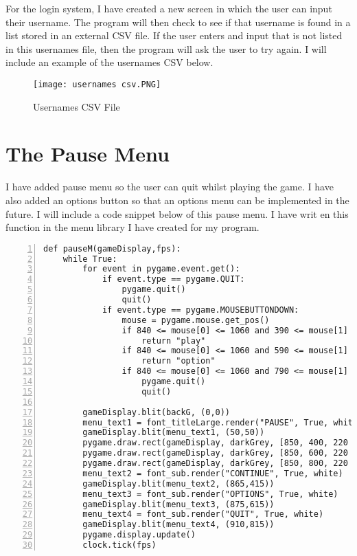 \documentclass[12pt]{report}
\begin{document}
\normalsize

For the login system, I have created a new screen in which the user can input their username. The program will then check to see if that username is found in a list stored in an external CSV file. If the user enters and input that is not listed in this usernames file, then the program will ask the user to try again. I will include an example of the usernames CSV below.

\begin{figure}[H]
    \centering
    \texttt{[image: usernames csv.PNG]}
    \caption{Usernames CSV File}
\end{figure}

\pagebreak

\section{The Pause Menu}
I have added pause menu so the user can quit whilst playing the game. I have also added an options button so that an options menu can be implemented in the future. I will include a code snippet below of this pause menu. I have writ en this function in the menu library I have created for my program.

\small

\begin{Verbatim}[numbers=left, frame=single]
def pauseM(gameDisplay,fps):
    while True:
        for event in pygame.event.get():
            if event.type == pygame.QUIT:
                pygame.quit()
                quit()
            if event.type == pygame.MOUSEBUTTONDOWN:
                mouse = pygame.mouse.get_pos()
                if 840 <= mouse[0] <= 1060 and 390 <= mouse[1] <= 470:
                    return "play"
                if 840 <= mouse[0] <= 1060 and 590 <= mouse[1] <= 670:
                    return "option"
                if 840 <= mouse[0] <= 1060 and 790 <= mouse[1] <= 870:
                    pygame.quit()
                    quit()

        gameDisplay.blit(backG, (0,0))  
        menu_text1 = font_titleLarge.render("PAUSE", True, white)
        gameDisplay.blit(menu_text1, (50,50))
        pygame.draw.rect(gameDisplay, darkGrey, [850, 400, 220 , 60])
        pygame.draw.rect(gameDisplay, darkGrey, [850, 600, 220 , 60])
        pygame.draw.rect(gameDisplay, darkGrey, [850, 800, 220 , 60])
        menu_text2 = font_sub.render("CONTINUE", True, white)
        gameDisplay.blit(menu_text2, (865,415))
        menu_text3 = font_sub.render("OPTIONS", True, white)
        gameDisplay.blit(menu_text3, (875,615))
        menu_text4 = font_sub.render("QUIT", True, white)
        gameDisplay.blit(menu_text4, (910,815))
        pygame.display.update()                                                                     
        clock.tick(fps)
\end{Verbatim}
\end{document}
